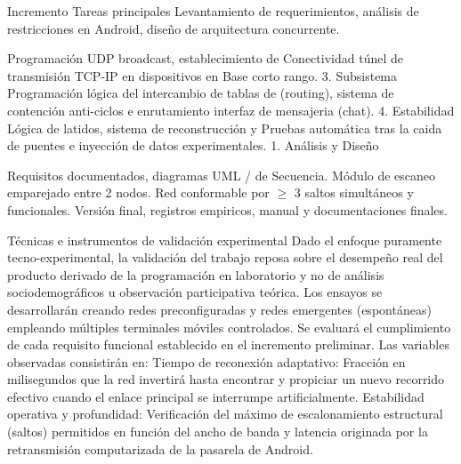 Incremento Tareas principales Levantamiento de requerimientos, análisis de restricciones en Android, diseño de arquitectura concurrente.

Programación UDP broadcast, establecimiento de Conectividad túnel de transmisión TCP-IP en dispositivos en Base corto rango. 3. Subsistema Programación lógica del intercambio de tablas de (routing), sistema de contención anti-ciclos e enrutamiento interfaz de mensajeria (chat). 4. Estabilidad Lógica de latidos, sistema de reconstrucción y Pruebas automática tras la caida de puentes e inyección de datos experimentales. 1. Análisis y Diseño

Requisitos documentados, diagramas UML / de Secuencia. Módulo de escaneo emparejado entre 2 nodos. Red conformable por $\geq$ 3 saltos simultáneos y funcionales. Versión final, registros empiricos, manual y documentaciones finales.

Técnicas e instrumentos de validación experimental Dado el enfoque puramente tecno-experimental, la validación del trabajo reposa sobre el desempeño real del producto derivado de la programación en laboratorio y no de análisis sociodemográficos u observación participativa teórica. Los ensayos se desarrollarán creando redes preconfiguradas y redes emergentes (espontáneas) empleando múltiples terminales móviles controlados. Se evaluará el cumplimiento de cada requisito funcional establecido en el incremento preliminar. Las variables observadas consistirán en: Tiempo de reconexión adaptativo: Fracción en milisegundos que la red invertirá hasta encontrar y propiciar un nuevo recorrido efectivo cuando el enlace principal se interrumpe artificialmente. Estabilidad operativa y profundidad: Verificación del máximo de escalonamiento estructural (saltos) permitidos en función del ancho de banda y latencia originada por la retransmisión computarizada de la pasarela de Android.

